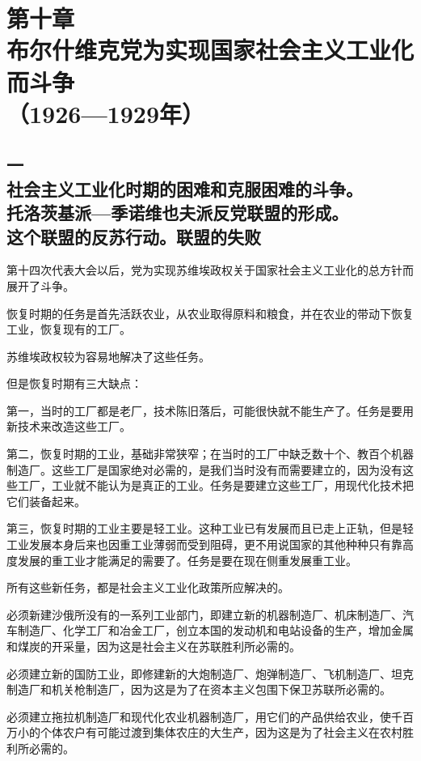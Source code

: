 \section[第十章\q 布尔什维克党为实现国家社会主义工业化而斗争（1926—1929年）]{第十章\\ 布尔什维克党为实现国家社会主义工业化而斗争 \\{（1926—1929年）}}

\subsection[一\q 社会主义工业化时期的困难和克服困难的斗争。托洛茨基派—季诺维也夫派反党联盟的形成。这个联盟的反苏行动。联盟的失败]{一\\ 社会主义工业化时期的困难和克服困难的斗争。\\托洛茨基派—季诺维也夫派反党联盟的形成。\\这个联盟的反苏行动。联盟的失败}

第十四次代表大会以后，党为实现苏维埃政权关于国家社会主义工业化的总方针而展开了斗争。

恢复时期的任务是首先活跃农业，从农业取得原料和粮食，并在农业的带动下恢复工业，恢复现有的工厂。

苏维埃政权较为容易地解决了这些任务。

但是恢复时期有三大缺点：

第一，当时的工厂都是老厂，技术陈旧落后，可能很快就不能生产了。任务是要用新技术来改造这些工厂。

第二，恢复时期的工业，基础非常狭窄；在当时的工厂中缺乏数十个、教百个机器制造厂。这些工厂是国家绝对必需的，是我们当时没有而需要建立的，因为没有这些工厂，工业就不能认为是真正的工业。任务是要建立这些工厂，用现代化技术把它们装备起来。

第三，恢复时期的工业主要是轻工业。这种工业已有发展而且已走上正轨，但是轻工业发展本身后来也因重工业薄弱而受到阻碍，更不用说国家的其他种种只有靠高度发展的重工业才能满足的需要了。任务是要在现在侧重发展重工业。

所有这些新任务，都是社会主义工业化政策所应解决的。

必须新建沙俄所没有的一系列工业部门，即建立新的机器制造厂、机床制造厂、汽车制造厂、化学工厂和冶金工厂，创立本国的发动机和电站设备的生产，增加金属和煤炭的开采量，因为这是社会主义在苏联胜利所必需的。

必须建立新的国防工业，即修建新的大炮制造厂、炮弹制造厂、飞机制造厂、坦克制造厂和机关枪制造厂，因为这是为了在资本主义包围下保卫苏联所必需的。

必须建立拖拉机制造厂和现代化农业机器制造厂，用它们的产品供给农业，使千百万小的个体农户有可能过渡到集体农庄的大生产，因为这是为了社会主义在农村胜利所必需的。

